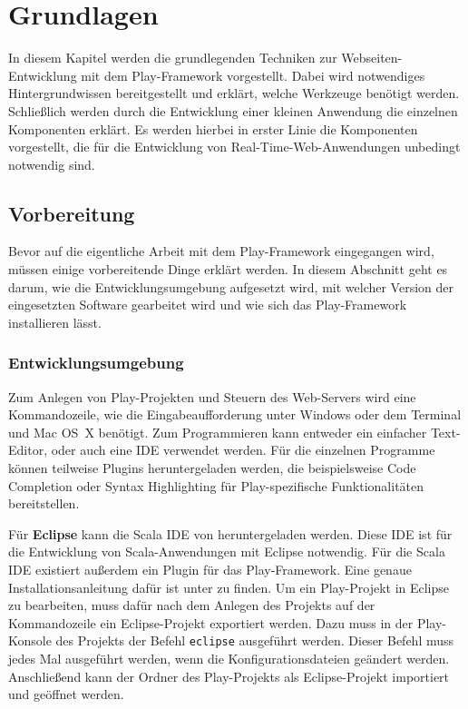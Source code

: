 
\chapter{Grundlagen} %
\label{cha:grundlagen}

In diesem Kapitel werden die grundlegenden Techniken zur Webseiten-Entwicklung mit dem Play-Framework vorgestellt.
Dabei wird notwendiges Hintergrundwissen bereitgestellt und erklärt, welche Werkzeuge benötigt werden.
Schließlich werden durch die Entwicklung einer kleinen Anwendung die einzelnen Komponenten erklärt.
Es werden hierbei in erster Linie die Komponenten vorgestellt, die für die Entwicklung von Real-Time-Web-Anwendungen unbedingt notwendig sind.


\section{Vorbereitung} %
\label{sec:vorbereitung}

Bevor auf die eigentliche Arbeit mit dem Play-Framework eingegangen wird, müssen einige vorbereitende Dinge erklärt werden.
In diesem Abschnitt geht es darum, wie die Entwicklungsumgebung aufgesetzt wird, mit welcher Version der eingesetzten Software gearbeitet wird und wie sich das Play-Framework installieren lässt.

\subsection{Entwicklungsumgebung} %
\label{sub:entwicklungsumgebung}

Zum Anlegen von Play-Projekten und Steuern des Web-Servers wird eine Kommandozeile, wie die Eingabeaufforderung unter Windows oder dem Terminal und Mac OS~X benötigt.
Zum Programmieren kann entweder ein einfacher Text-Editor, oder auch eine IDE verwendet werden.
Für die einzelnen Programme können teilweise Plugins heruntergeladen werden, die beispielsweise Code Completion oder Syntax Highlighting für Play-spezifische Funktionalitäten bereitstellen.

Für \textbf{Eclipse} kann die Scala IDE von \citealt{scala_ide} heruntergeladen werden.
Diese IDE ist für die Entwicklung von Scala-Anwendungen mit Eclipse notwendig.
Für die Scala IDE existiert außerdem ein Plugin für das Play-Framework.
Eine genaue Installationsanleitung dafür ist unter \citealt{scala_ide_play_plugin} zu finden.
Um ein Play-Projekt in Eclipse zu bearbeiten, muss dafür nach dem Anlegen des Projekts auf der Kommandozeile ein Eclipse-Projekt exportiert werden.
Dazu muss in der Play-Konsole des Projekts der Befehl \lstinline|eclipse| ausgeführt werden.
Dieser Befehl muss jedes Mal ausgeführt werden, wenn die Konfigurationsdateien geändert werden.
Anschließend kann der Ordner des Play-Projekts als Eclipse-Projekt importiert und geöffnet werden.

